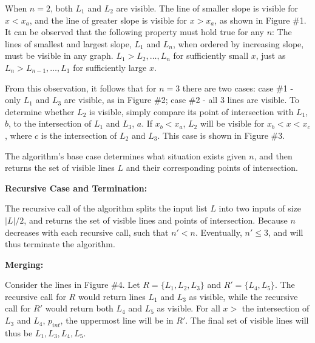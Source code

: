 \documentclass{article}
\begin{document}
When $n=2$, both $L_1$ and $L_2$ are visible.  
The line of smaller slope is visible for $x < x_a$, and the line of greater slope is visible for $x > x_a$, as shown in Figure \#1.
It can be observed that the following property must hold true for any $n$:  \newline
The lines of smallest and largest slope, $L_1$ and $L_n$, when ordered by increasing slope, must be visible in any graph.  
$L_1 > L_2 , \dots , L_n$ for sufficiently small $x$, just as $L_n > L_{n-1}, \dots , L_1$ for sufficiently large $x$.

From this observation, it follows that for $n=3$ there are two cases:  case \#1 - only $L_1$ and $L_3$ are visible, as in Figure \#2; case \#2 - all 3 lines are visible.
To determine whether $L_2$ is visible, simply compare its point of intersection with $L_1$, $b$, to the intersection of $L_1$ and $L_3$, $a$.  
If $x_b < x_a$, $L_2$ will be visible for $x_b < x < x_c$, where $c$ is the intersection of $L_2$ and $L_3$.  This case is shown in Figure \#3.

The algorithm's base case determines what situation exists given $n$, and then returns the set of visible lines $L$ and their corresponding points of intersection.

\noindent \textbf{Recursive Case and Termination:}

The recursive call of the algorithm splits the input list $L$ into two inputs of size $|L|/2$, and returns the set of visible lines and points of intersection.  Because $n$ decreases with each recursive call, such that $n' < n$.  Eventually, $n' \leq 3$, and will thus terminate the algorithm.

\noindent \textbf{Merging:}

Consider the lines in Figure \#4.  Let $R = \{L_1, L_2, L_3\}$ and $R' = \{L_4, L_5 \}$.
The recursive call for $R$ would return lines $L_1$ and $L_3$ as visible, while the recursive call for $R'$ would return both $L_4$ and $L_5$ as visible.
For all $x >$ the intersection of $L_3$ and $L_4$, $p_{int}$, the uppermost line will be in $R'$.  The final set of visible lines will thus be $L_1, L_3, L_4, L_5$.
\end{document}
